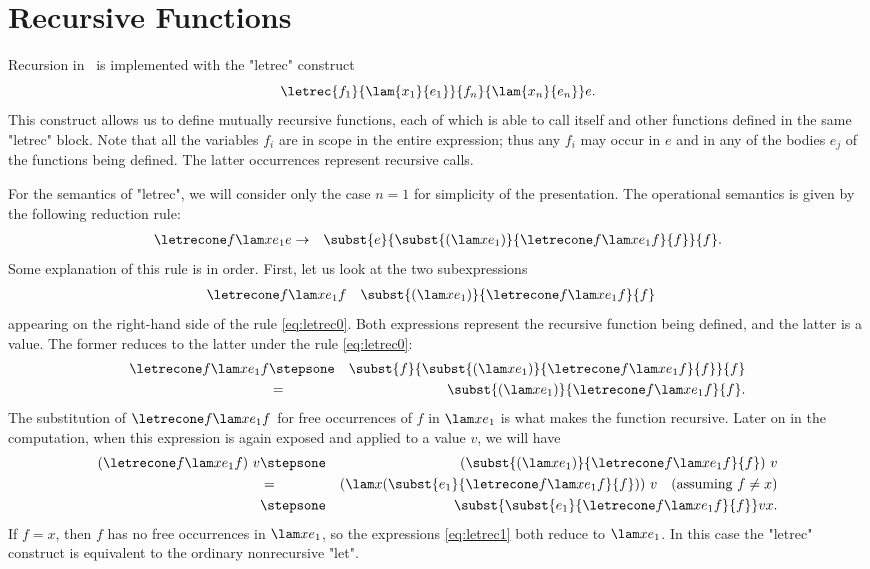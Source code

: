 \section{Recursive Functions}

Recursion in \FL\ is implemented with the "letrec" construct
\[
\letrec{f_1}{\lam{x_1}{e_1}}{f_n}{\lam{x_n}{e_n}}e.
\]
This construct allows us to define mutually recursive functions, each of which is able to call itself and other functions defined in the same "letrec" block. Note that all the variables $f_i$ are in scope in the entire expression; thus any $f_i$ may occur in $e$ and in any of the bodies $e_j$ of the functions being defined. The latter occurrences represent recursive calls.

For the semantics of "letrec", we will consider only the case $n=1$ for simplicity of the presentation. The operational semantics is given by the following reduction rule:
\begin{eqnarray}
\letrecone f{\lam x{e_1}}e &\to& \subst{e}{\subst{(\lam x{e_1})}{\letrecone f{\lam x{e_1}}f}{f}}{f}.\label{eq:letrec0}
\end{eqnarray}
Some explanation of this rule is in order. First, let us look at the two subexpressions
\begin{align}
& \letrecone f{\lam x{e_1}}f &&
\subst{(\lam x{e_1})}{\letrecone f{\lam x{e_1}}f}{f}\label{eq:letrec1}
\end{align}
appearing on the right-hand side of the rule \eqref{eq:letrec0}.
Both expressions represent the recursive function being defined, and the latter is a value. The former reduces to the latter under the rule \eqref{eq:letrec0}:
\begin{eqnarray*}
\letrecone f{\lam x{e_1}}f &\stepsone& \subst{f}{\subst{(\lam x{e_1})}{\letrecone f{\lam x{e_1}}f}{f}}{f}\\
&=& \subst{(\lam x{e_1})}{\letrecone f{\lam x{e_1}}f}{f}.
\end{eqnarray*}
The substitution of $\letrecone f{\lam x{e_1}}f$ for free occurrences of $f$ in $\lam x{e_1}$ is what makes the function recursive. Later on in the computation, when this expression is again exposed and applied to a value $v$, we will have
\begin{eqnarray*}
(\letrecone f{\lam x{e_1}}f)\ v &\stepsone& (\subst{(\lam x{e_1})}{\letrecone f{\lam x{e_1}}f}{f})\ v\\
&=& (\lam x{(\subst{e_1}{\letrecone f{\lam x{e_1}}f}{f})})\ v\quad\text{(assuming $f\neq x$)}\\
&\stepsone& \subst{\subst{e_1}{\letrecone f{\lam x{e_1}}f}{f}}vx.
\end{eqnarray*}
If $f=x$, then $f$ has no free occurrences in $\lam x{e_1}$, so the expressions \eqref{eq:letrec1} both reduce to $\lam x{e_1}$. In this case the "letrec" construct is equivalent to the ordinary nonrecursive "let".

